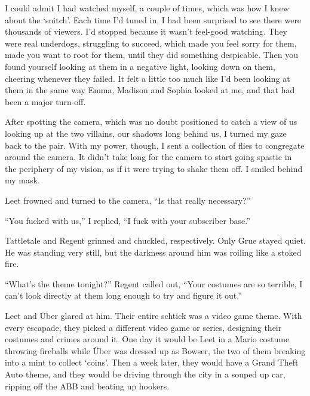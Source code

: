 I could admit I had watched myself, a couple of times, which was how I knew about the `snitch'.  Each time I'd tuned in, I had been surprised to see there were thousands of viewers.  I'd stopped because it wasn't feel-good watching.  They were real underdogs, struggling to succeed, which made you feel sorry for them, made you want to root for them, until they did something despicable.  Then you found yourself looking at them in a negative light, looking down on them, cheering whenever they failed.  It felt a little too much like I'd been looking at them in the same way Emma, Madison and Sophia looked at me, and that had been a major turn-off.



After spotting the camera, which was no doubt positioned to catch a view of us looking up at the two villains, our shadows long behind us, I turned my gaze back to the pair.  With my power, though, I sent a collection of flies to congregate around the camera.  It didn't take long for the camera to start going spastic in the periphery of my vision, as if it were trying to shake them off.  I smiled behind my mask.



Leet frowned and turned to the camera, ``Is that really necessary?''



``You fucked with us,'' I replied, ``I fuck with your subscriber base.''



Tattletale and Regent grinned and chuckled, respectively.  Only Grue stayed quiet.  He was standing very still, but the darkness around him was roiling like a stoked fire.



``What's the theme tonight?'' Regent called out, ``Your costumes are so terrible, I can't look directly at them long enough to try and figure it out.''



Leet and \"{U}ber glared at him.  Their entire schtick was a video game theme.  With every escapade, they picked a different video game or series, designing their costumes and crimes around it.  One day it would be Leet in a Mario costume throwing fireballs while \"{U}ber was dressed up as Bowser, the two of them breaking into a mint to collect `coins'.  Then a week later, they would have a Grand Theft Auto theme, and they would be driving through the city in a souped up car, ripping off the ABB and beating up hookers.



